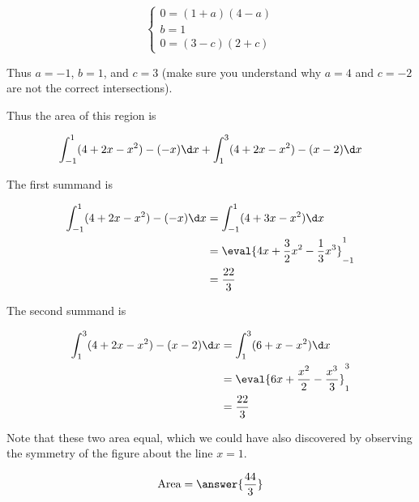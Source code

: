 \documentclass[handout]{ximera}
\begin{document}
\begin{exercise}
\begin{hint}
\[	
	\begin{cases}
		0 = (1+a)(4-a)\\
		 b = 1\\
		0= (3-c)(2+c)
	\end{cases}	
\]

Thus $a=-1$,  $b = 1$, and $c = 3$ (make sure you understand why $a=4$ and $c=-2$ are not the correct intersections).
\end{hint}


\begin{hint}
	Thus the area of this region is

	\[
	\int_{-1}^{1} (4+2x-x^2) - (-x) \d x + \int_{1}^{3} (4+2x-x^2) - (x-2) \d x
	\]
\end{hint}

\begin{hint}
	The first summand is

	\begin{align*}
		\int_{-1}^{1} (4+2x-x^2) - (-x) \d x &=  \int_{-1}^{1} (4+3x-x^2) \d x\\
		&= \eval{4x+\frac{3}{2}x^2-\frac{1}{3}x^3}_{-1}^1\\
		&= \frac{22}{3}
	\end{align*}

	The second summand is

	\begin{align*}
		\int_{1}^{3} (4+2x-x^2) - (x-2) \d x &= \int_{1}^{3} (6+x-x^2) \d x\\
		&= \eval{6x+\frac{x^2}{2}-\frac{x^3}{3}}_1^3\\
		&= \frac{22}{3}
	\end{align*}

	Note that these two area equal, which we could have also discovered by observing the symmetry of the figure about the line $x=1$.
\end{hint}

	\[
		\textrm{Area} = \answer{\frac{44}{3}}
	\]

\end{exercise}
\end{document}
